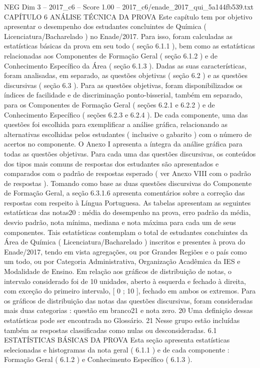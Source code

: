 \begin{textsample}{NEG Dim 3 – 2017\_c6 – Score 1.00 – 2017\_c6/enade\_2017\_qui\_5a144fb539.txt}  \label{ex:f3_neg_092}
CAPÍTULO 6 ANÁLISE TÉCNICA DA PROVA Este capítulo tem por objetivo apresentar o desempenho dos estudantes concluintes de Química ( Licenciatura/Bacharelado ) no Enade/2017.
Para isso, foram calculadas as estatísticas básicas da prova em seu todo ( seção 6.1.1 ), bem como as estatísticas relacionadas aos Componentes de Formação Geral ( seção 6.1.2 ) e de Conhecimento Específico da Área ( seção 6.1.3 ).
Dadas as suas características, foram analisadas, em separado, as questões objetivas ( seção 6.2 ) e as questões discursivas ( seção 6.3 ).
Para as questões objetivas, foram disponibilizados os índices de facilidade e de discriminação ponto-bisserial, também em separado, para os Componentes de Formação Geral ( seções 6.2.1 e 6.2.2 ) e de Conhecimento Específico ( seções 6.2.3 e 6.2.4 ).
De cada componente, uma das questões foi escolhida para exemplificar a análise gráfica, relacionando as alternativas escolhidas pelos estudantes ( inclusive o gabarito ) com o número de acertos no componente.
O Anexo I apresenta a íntegra da análise gráfica para todas as questões objetivas.
Para cada uma das questões discursivas, os conteúdos dos tipos mais comuns de respostas dos estudantes são apresentados e comparados com o padrão de respostas esperado ( ver Anexo VIII com o padrão de respostas ).
Tomando como base as duas questões discursivas do Componente de Formação Geral, a seção 6.3.1.6 apresenta comentários sobre a correção das respostas com respeito à Língua Portuguesa.
As tabelas apresentam as seguintes estatísticas das notas20 : média do desempenho na prova, erro padrão da média, desvio padrão, nota mínima, mediana e nota máxima para cada um de seus componentes.
Tais estatísticas contemplam o total de estudantes concluintes da Área de Química ( Licenciatura/Bacharelado ) inscritos e presentes à prova do Enade/2017, tendo em vista agregações, ou por Grandes Regiões e o país como um todo, ou por Categoria Administrativa, Organização Acadêmica da IES e Modalidade de Ensino.
Em relação aos gráficos de distribuição de notas, o intervalo considerado foi de 10 unidades, aberto à esquerda e fechado à direita, com exceção do primeiro intervalo, [ 0 ; 10 ], fechado em ambos os extremos.
Para os gráficos de distribuição das notas das questões discursivas, foram consideradas mais duas categorias : questão em branco21 e nota zero. 20 Uma definição dessas estatísticas pode ser encontrada no Glossário. 21 Nesse grupo estão incluídas também as respostas classificadas como nulas ou desconsideradas. 6.1 ESTATÍSTICAS BÁSICAS DA PROVA Esta seção apresenta estatísticas selecionadas e histogramas da nota geral ( 6.1.1 ) e de cada componente : Formação Geral ( 6.1.2 ) e Conhecimento Específico ( 6.1.3 ).

\end{textsample}
